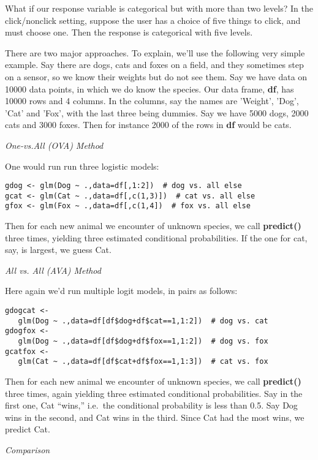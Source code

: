 What if our response variable is categorical but with more than two
levels?  In the click/nonclick setting, suppose the user has a choice of
five things to click, and must choose one.  Then the response is
categorical with five levels.  

There are two major approaches.  To explain, we'll use the following
very simple example. Say there are dogs, cats and foxes on a field, and
they sometimes step on a sensor, so we know their weights but do not see
them.  Say we have data on 10000 data points, in which we do know the
species.  Our data frame, \textbf{df}, has 10000 rows and 4 columns.  In
the columns, say the names are 'Weight', 'Dog', 'Cat' and 'Fox', with
the last three being dummies.  Say we have 5000 dogs, 2000 cats and 3000
foxes.  Then for instance 2000 of the rows in \textbf{df} would be cats.

\textit{One-vs.All (OVA) Method}

One would run run three logistic models:

\begin{lstlisting}
gdog <- glm(Dog ~ .,data=df[,1:2])  # dog vs. all else
gcat <- glm(Cat ~ .,data=df[,c(1,3)])  # cat vs. all else
gfox <- glm(Fox ~ .,data=df[,c(1,4])  # fox vs. all else
\end{lstlisting}

Then for each new animal we encounter of unknown species, we call
\textbf{predict()} three times, yielding three estimated conditional
probabilities.  If the one for cat, say, is largest, we guess Cat.

\textit{All vs. All (AVA) Method}

Here again we'd run multiple logit models, in pairs as follows:

\begin{lstlisting}
gdogcat <- 
   glm(Dog ~ .,data=df[df$dog+df$cat==1,1:2])  # dog vs. cat
gdogfox <- 
   glm(Dog ~ .,data=df[df$dog+df$fox==1,1:2])  # dog vs. fox
gcatfox <- 
   glm(Cat ~ .,data=df[df$cat+df$fox==1,1:3])  # cat vs. fox
\end{lstlisting}

Then for each new animal we encounter of unknown species, we call
\textbf{predict()} three times, again yielding three estimated
conditional probabilities.  Say in the first one, Cat ``wins,'' i.e.\
the conditional probability is less than 0.5.  Say Dog wins in the
second, and Cat wins in the third.  Since Cat had the most wins, we
predict Cat.

\textit{Comparison}

